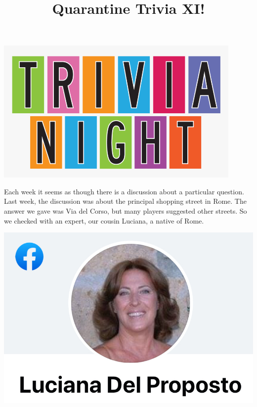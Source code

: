 \documentclass[11pt]{beamer}
\begin{document}
\title{Quarantine Trivia XI!}
\date{}

\begin{frame}
\titlepage{}
\begin{center}
\includegraphics[max width=0.9\textwidth,
    max height=0.4\textheight]{Images/triviatitleframelogo.png}
\end{center}
\end{frame}
\begin{frame}
Each week it seems as though there is a discussion about a particular question. Last
week, the discussion was about the principal shopping street in Rome. The answer we gave
was Via del Corso, but many players suggested other streets. So we checked with an
expert, our cousin Luciana, a native of Rome.

\begin{center}
\includegraphics[max width=.9\textwidth,max height=.4\textheight
]{Images/luciana.jpg}
\end{center}
\end{frame}
\end{document}
